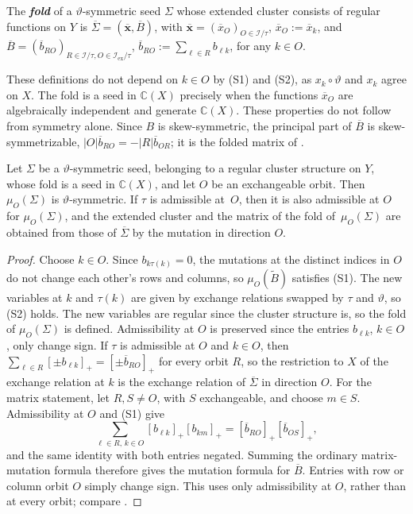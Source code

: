 \documentclass[a4paper]{amsart}
\numberwithin{equation}{section}
\theoremstyle{definition}
\theoremstyle{remark}
\newcommand{\bbC}{\mathbb{C}}
\newcommand{\mcI}{\mathcal{I}}
\newcommand{\bx}{\mathbf{x}}
\newcommand{\tB}{\widetilde{B}}
\newcommand{\vt}{\vartheta}
\newcommand{\ex}{\mathrm{ex}}
\newcommand{\newword}[1]{\textbf{\emph{#1}}}
\begin{document}
\begin{definition}
  \label{def: fold}
  The \newword{fold} of a $\vt$-symmetric seed $\Sigma$ whose extended cluster consists of regular functions on $Y$ is $\overline{\Sigma}=(\overline{\bx},\overline{B})$, with $\overline{\bx}=(\overline{x}_O)_{O\in\mcI/\tau}$, $\overline{x}_O:=\overline{x}_k$, and $\overline{B}=(\overline{b}_{RO})_{R\in\mcI/\tau,O\in\mcI_\ex/\tau}$, $\overline{b}_{RO}:=\sum_{\ell\in R}b_{\ell k}$, for any $k\in O$.
\end{definition}

These definitions do not depend on $k\in O$ by (S1) and (S2), as $x_k\circ\vt$ and $x_k$ agree on $X$.
The fold is a seed in $\bbC(X)$ precisely when the functions $\overline{x}_O$ are algebraically independent and generate $\bbC(X)$.
These properties do not follow from symmetry alone.
Since $B$ is skew-symmetric, the principal part of $\overline{B}$ is skew-symmetrizable, $|O|\overline{b}_{RO}=-|R|\overline{b}_{OR}$; it is the folded matrix of \cite[(5.5)]{NS14}.

\begin{proposition}
  \label{prop: fold mutation}
  Let $\Sigma$ be a $\vt$-symmetric seed, belonging to a regular cluster structure on $Y$, whose fold is a seed in $\bbC(X)$, and let $O$ be an exchangeable orbit.
  Then $\mu_O(\Sigma)$ is $\vt$-symmetric.
  If $\tau$ is admissible at~$O$, then it is also admissible at $O$ for $\mu_O(\Sigma)$, and the extended cluster and the matrix of the fold of~$\mu_O(\Sigma)$ are obtained from those of $\overline{\Sigma}$ by the mutation in direction $O$.
\end{proposition}
\begin{proof}
  Choose $k\in O$.
  Since $b_{k\tau(k)}=0$, the mutations at the distinct indices in $O$ do not change each other's rows and columns, so $\mu_O(\tB)$ satisfies (S1).
  The new variables at $k$ and $\tau(k)$ are given by exchange relations swapped by $\tau$ and $\vt$, so (S2) holds.
  The new variables are regular since the cluster structure is, so the fold of $\mu_O(\Sigma)$ is defined.
  Admissibility at $O$ is preserved since the entries $b_{\ell k}$, $k\in O$, only change sign.
  If $\tau$ is admissible at $O$ and $k\in O$, then $\sum_{\ell\in R}[\pm b_{\ell k}]_+=[\pm\overline{b}_{RO}]_+$ for every orbit $R$, so the restriction to $X$ of the exchange relation at $k$ is the exchange relation of $\overline{\Sigma}$ in direction $O$.
  For the matrix statement, let $R,S\neq O$, with $S$ exchangeable, and choose $m\in S$.
  Admissibility at $O$ and (S1) give
  \[
    \sum_{\ell\in R,\,k\in O}[b_{\ell k}]_+[b_{km}]_+
    =[\overline{b}_{RO}]_+[\overline{b}_{OS}]_+,
  \]
  and the same identity with both entries negated.
  Summing the ordinary matrix-mutation formula therefore gives the mutation formula for $\overline{B}$.
  Entries with row or column orbit $O$ simply change sign.
  This uses only admissibility at $O$, rather than at every orbit; compare \cite[proof of Theorem~2.24]{Dup08}.
\end{proof}
\end{document}
